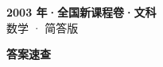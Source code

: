 \documentclass[zihao=-4, a4paper]{ctexart}
\begin{document}
\begin{center}
  {\Large\bfseries 2003 年·全国新课程卷·文科}\\[4pt]
  {\large 数学 · 简答版}
\end{center}
\medskip
{}

\clearpage
{}
\begin{center}{\Large\bfseries 答案速查}\end{center}
\medskip

\end{document}
